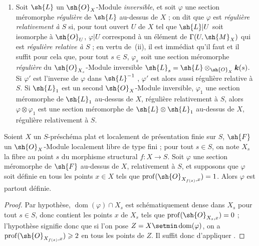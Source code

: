 \begin{remarks}[20.6.5]
\begin{enumerate}[label=(\roman*)]
  \item Soit $\sh{L}$ un $\sh{O}_X$-Module \emph{inversible}, et soit $\varphi$ une section méromorphe \emph{régulière} de $\sh{L}$ au-dessus de $X$  ; on dit que $\varphi$ est \emph{régulière relativement à $S$} si, pour tout ouvert $U$ de $X$ tel que $\sh{L}|U$ soit isomorphe à $\sh{O}_U$, $\varphi|U$ correspond à un élément de $\Gamma(U,\sh{M}_X)$ qui est \emph{régulière relative à $S$} ; en vertu de~(ii), il est immédiat qu'il faut et il suffit pour cela que, pour tout $s\in S$, $\varphi_s$ soit une section méromorphe \emph{régulière}  du $\sh{O}_{X_s}$-Module inversible $\sh{L}_s=\sh{L}\otimes_{\sh{O}_X}\boldsymbol{k}(s)$.
  Si $\varphi'$ est l'inverse de $\varphi$ dans $\sh{L}^{-1}$ , $\varphi'$ est alors aussi régulière relative à $S$.
  Si $\sh{L}_1$ est un second $\sh{O}_X$-Module inversible, $\varphi_1$ une section méromorphe de $\sh{L}_1$ au-dessus de $X$, régulière relativement à $S$, alors $\varphi\otimes\varphi_1$ est une section méromorphe de $\sh{L}\otimes\sh{L}_1$ au-dessus de $X$, régulière relativement à $S$.
\end{enumerate}
\end{remarks}

\begin{proposition}[20.6.6]
\label{IV.20.6.6}
Soient $X$ un $S$-préschéma plat et localement de présentation finie sur $S$, $\sh{F}$ un $\sh{O}_X$-Module localement libre de type fini ; pour tout $s\in S$, on note $X_s$ la fibre au point $s$ du morphisme structural $f:X\to S$.
Soit $\varphi$ une section méromorphe de $\sh{F}$ au-dessus de $X$, relativement à $S$, et supposons que $\varphi$ soit définie en tous les points $x\in X$ tels que $\operatorname{prof}(\sh{O}_{X_{f(x)},x})=1$.
Alors $\varphi$ est partout définie.
\end{proposition}

\begin{proof}
Par hypothèse, $\operatorname{dom}(\varphi)\cap X_s$ est schématiquement dense dans $X_s$ pour tout $s\in S$, donc contient les points $x$ de $X_s$ tels que $\operatorname{prof}(\sh{O}_{X_s,x})=0$  ; l'hypothèse signifie donc que si l'on pose $Z=X\setmin\operatorname{dom}(\varphi)$, on a $\operatorname{prof}(\sh{O}_{X_{f(x)},x})\geq2$ en tous les points de $Z$.
Il suffit donc d'appliquer .
\end{proof}

